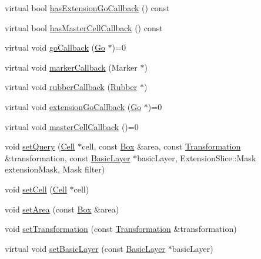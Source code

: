 \begin{DoxyCompactItemize}
\item 
virtual bool \hyperlink{classHurricane_1_1Query_abd8ff8d187e4499e625feb12c68e9b29}{has\+Extension\+Go\+Callback} () const
\item 
virtual bool \hyperlink{classHurricane_1_1Query_a7ebb7b16bab183cd4508dc5639bd12ab}{has\+Master\+Cell\+Callback} () const
\item 
virtual void \hyperlink{classHurricane_1_1Query_a59007148bd0afa0405801f341e7e4139}{go\+Callback} (\hyperlink{classHurricane_1_1Go}{Go} $\ast$)=0
\item 
virtual void \hyperlink{classHurricane_1_1Query_a4ad5bf076073f107189d4b7ee48f040e}{marker\+Callback} (Marker $\ast$)
\item 
virtual void \hyperlink{classHurricane_1_1Query_acec322581e35c1556ce706aa5ea66aa3}{rubber\+Callback} (\hyperlink{classHurricane_1_1Rubber}{Rubber} $\ast$)
\item 
virtual void \hyperlink{classHurricane_1_1Query_a75b87e969b64caaf24ec058c0d2dfa68}{extension\+Go\+Callback} (\hyperlink{classHurricane_1_1Go}{Go} $\ast$)=0
\item 
virtual void \hyperlink{classHurricane_1_1Query_abaf97e93c7fa96469adf64f7865938b4}{master\+Cell\+Callback} ()=0
\item 
void \hyperlink{classHurricane_1_1Query_a63c50b61799b729ff4b2e7e291959b4d}{set\+Query} (\hyperlink{classHurricane_1_1Cell}{Cell} $\ast$cell, const \hyperlink{classHurricane_1_1Box}{Box} \&area, const \hyperlink{classHurricane_1_1Transformation}{Transformation} \&transformation, const \hyperlink{classHurricane_1_1BasicLayer}{Basic\+Layer} $\ast$basic\+Layer, Extension\+Slice\+::\+Mask extension\+Mask, Mask filter)
\item 
void \hyperlink{classHurricane_1_1Query_a36378e1604e484450a3ccee0ececcff7}{set\+Cell} (\hyperlink{classHurricane_1_1Cell}{Cell} $\ast$cell)
\item 
void \hyperlink{classHurricane_1_1Query_ac41de6b1535c256c4929c075769890b1}{set\+Area} (const \hyperlink{classHurricane_1_1Box}{Box} \&area)
\item 
void \hyperlink{classHurricane_1_1Query_a885360fc2f351fc3612c7dda363b5131}{set\+Transformation} (const \hyperlink{classHurricane_1_1Transformation}{Transformation} \&transformation)
\item 
virtual void \hyperlink{classHurricane_1_1Query_ac3718c4e2cd4d5e80af32558285481af}{set\+Basic\+Layer} (const \hyperlink{classHurricane_1_1BasicLayer}{Basic\+Layer} $\ast$basic\+Layer)
\item 

\end{DoxyCompactItemize}
